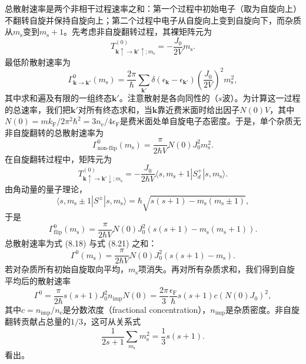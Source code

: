 总散射速率是两个非相干过程速率之和：第一个过程中初始电子（取为自旋向上）不翻转自旋并保持自旋向上；第二个过程中电子从自旋向上变到自旋向下，而杂质从$m_{\mathrm{s}}$变到$m_{\mathrm{s}}+1$。先考虑非自旋翻转过程，其裸矩阵元为
\begin{equation*}
T_{\mathbf{k}\uparrow\to\mathbf{k}'\uparrow;m_{\mathrm{s}}}^{(0)} = -\frac{J_0}{2V}m_{\mathrm{s}}.
\tag{8.16}
\end{equation*}
最低阶散射速率为
\begin{equation*}
\Gamma_{\mathbf{k}\to\mathbf{k}'}^{0}(m_{\mathrm{s}}) = \frac{2\pi}{\hbar}\sum_{\mathbf{k}'}\delta(\epsilon_{\mathbf{k}}-\epsilon_{\mathbf{k}'})\left(\frac{J_0}{2V}\right)^2 m_{\mathrm{s}}^2,
\tag{8.17}
\end{equation*}
其中求和遍及有限的一组终态$\mathbf{k}'$。注意散射是各向同性的（$s$波）。为计算这一过程的总速率，我们把$\mathbf{k}'$对所有终态求和，当$\mathbf{k}$靠近费米面时给出因子$N(0)V$，其中$N(0)=mk_{\mathrm{F}}/2\pi^2\hbar^2=3n_{\mathrm{e}}/4\epsilon_{\mathrm{F}}$是费米面处单自旋电子态密度。于是，单个杂质无非自旋翻转的总散射速率为
\begin{equation*}
\Gamma_{\mathrm{non\text{-}flip}}^{0}(m_{\mathrm{s}}) = \frac{\pi}{2\hbar V}N(0)J_0^2 m_{\mathrm{s}}^2.
\tag{8.18}
\end{equation*}
在自旋翻转过程中，矩阵元为
\begin{equation*}
T_{\mathbf{k}\uparrow\to\mathbf{k}'\downarrow;m_{\mathrm{s}}}^{(0)} = -\frac{J_0}{2\hbar V}\langle s,m_{\mathrm{s}}+1|S_d^{+}|s,m_{\mathrm{s}}\rangle.
\tag{8.19}
\end{equation*}
由角动量的量子理论，
\begin{equation*}
\langle s,m_{\mathrm{s}}\pm 1|S^{\pm}|s,m_{\mathrm{s}}\rangle = \hbar\sqrt{s(s+1)-m_{\mathrm{s}}(m_{\mathrm{s}}\pm 1)},
\tag{8.20}
\end{equation*}
于是
\begin{equation*}
\Gamma_{\mathrm{flip}}^{0}(m_{\mathrm{s}}) = \frac{\pi}{2\hbar V}N(0)J_0^2\left(s(s+1)-m_{\mathrm{s}}(m_{\mathrm{s}}+1)\right).
\tag{8.21}
\end{equation*}
总散射速率为式 (8.18) 与式 (8.21) 之和：
\begin{equation*}
\Gamma^{0}(m_{\mathrm{s}}) = \frac{\pi}{2\hbar V}N(0)J_0^2\left(s(s+1)-m_{\mathrm{s}}\right).
\tag{8.22}
\end{equation*}
若对杂质所有初始自旋取向平均，$m_{\mathrm{s}}$项消失。再对所有杂质求和，我们得到自旋平均后的散射速率
\begin{equation*}
\Gamma^{0} = \frac{\pi}{2\hbar}s(s+1)J_0^2 n_{\mathrm{imp}}N(0) = \frac{2\pi}{3}\frac{\epsilon_{\mathrm{F}}}{\hbar}s(s+1)c(N(0)J_0)^2,
\tag{8.23}
\end{equation*}
其中$c=n_{\mathrm{imp}}/n_{\mathrm{e}}$是分数浓度（fractional concentration），$n_{\mathrm{imp}}$是杂质密度。非自旋翻转贡献占总量的$1/3$，这可从关系式
\begin{equation*}
\frac{1}{2s+1}\sum_{m_{\mathrm{s}}}m_{\mathrm{s}}^2 = \frac{1}{3}s(s+1).
\tag{8.24}
\end{equation*}
看出。

